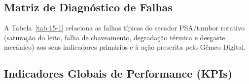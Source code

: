 \documentclass[12pt,a4paper]{article}
\numberwithin{equation}{section}
\numberwithin{table}{section}
\numberwithin{figure}{section}
\begin{document}
		\subsection{\textbf{Matriz de Diagnóstico de Falhas}}
		A Tabela~\ref{tab:15-1} relaciona as falhas típicas do secador PSA/tambor rotativo (saturação do leito, falha de chaveamento, degradação térmica e desgaste mecânico) aos seus indicadores primários e à ação prescrita pelo Gêmeo Digital.
		\begin{table}[h!tbp]
			\centering
			\caption[Matriz de falhas do secador PSA e do tambor rotativo]{Matriz de diagnóstico de falhas do secador PSA e do tambor rotativo (HOC).}
			\label{tab:15-1}
		\end{table}
		
		\subsection{\textbf{Indicadores Globais de Performance (KPIs)}}
		
\end{document}
